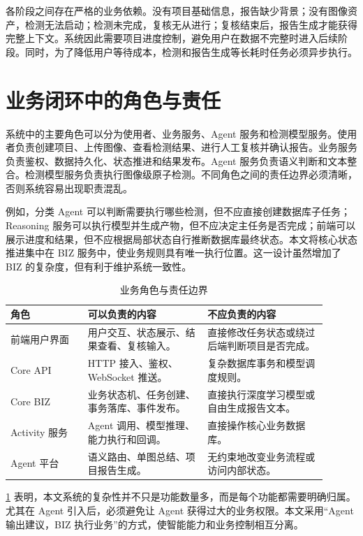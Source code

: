 各阶段之间存在严格的业务依赖。没有项目基础信息，报告缺少背景；没有图像资产，检测无法启动；检测未完成，复核无从进行；复核结束后，报告生成才能获得完整上下文。系统因此需要项目进度控制，避免用户在数据不完整时进入后续阶段。同时，为了降低用户等待成本，检测和报告生成等长耗时任务必须异步执行。

\section{业务闭环中的角色与责任}
\label{sec:req-role-responsibility}

系统中的主要角色可以分为使用者、业务服务、Agent 服务和检测模型服务。使用者负责创建项目、上传图像、查看检测结果、进行人工复核并确认报告。业务服务负责鉴权、数据持久化、状态推进和结果发布。Agent 服务负责语义判断和文本整合。检测模型服务负责执行图像级原子检测。不同角色之间的责任边界必须清晰，否则系统容易出现职责混乱。

例如，分类 Agent 可以判断需要执行哪些检测，但不应直接创建数据库子任务；Reasoning 服务可以执行模型并生成产物，但不应决定主任务是否完成；前端可以展示进度和结果，但不应根据局部状态自行推断数据库最终状态。本文将核心状态推进集中在 BIZ 服务中，使业务规则具有唯一执行位置。这一设计虽然增加了 BIZ 的复杂度，但有利于维护系统一致性。

\begin{table}[!htb]
  \caption{业务角色与责任边界}\label{tab:role-boundary}
  \centering
  \begin{tabular}{@{}p{0.22\linewidth}p{0.34\linewidth}p{0.34\linewidth}@{}} \toprule
    \textbf{角色} & \textbf{可以负责的内容} & \textbf{不应负责的内容} \\ \midrule
    前端用户界面 & 用户交互、状态展示、结果查看、复核输入。 & 直接修改任务状态或绕过后端判断项目是否完成。 \\
    Core API & HTTP 接入、鉴权、WebSocket 推送。 & 复杂数据库事务和模型调度规则。 \\
    Core BIZ & 业务状态机、任务创建、事务落库、事件发布。 & 直接执行深度学习模型或自由生成报告文本。 \\
    Activity 服务 & Agent 调用、模型推理、能力执行和回调。 & 直接操作核心业务数据库。 \\
    Agent 平台 & 语义路由、单图总结、项目报告生成。 & 无约束地改变业务流程或访问内部状态。 \\ \bottomrule
  \end{tabular}
\end{table}

\cref{tab:role-boundary} 表明，本文系统的复杂性并不只是功能数量多，而是每个功能都需要明确归属。尤其在 Agent 引入后，必须避免让 Agent 获得过大的业务权限。本文采用“Agent 输出建议，BIZ 执行业务”的方式，使智能能力和业务控制相互分离。

